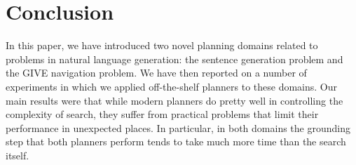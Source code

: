 \section{Conclusion} \label{sec:conclusion}

In this paper, we have introduced two novel planning domains related
to problems in natural language generation: the sentence generation
problem and the GIVE navigation problem.  We have then reported on a
number of experiments in which we applied off-the-shelf planners to
these domains.  Our main results were that while modern planners do
pretty well in controlling the complexity of search, they suffer from
practical problems that limit their performance in unexpected places.
In particular, in both domains the grounding step that both planners
perform tends to take much more time than the search itself.



